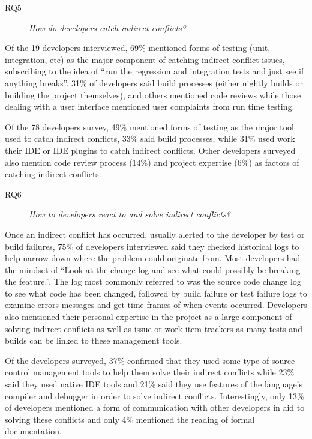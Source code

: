 \documentclass[conference]{IEEEtran}
\begin{document}

\begin{description}
	\item[RQ5] \textit{How do developers catch indirect conflicts?}
\end{description}

Of the 19 developers interviewed, 69\% mentioned forms of testing (unit, integration, etc) as the major component of catching indirect
conflict issues, subscribing to the idea of ``run the regression and integration tests and just see if anything breaks''. 31\% of developers 
said build processes (either nightly builds or building the project themselves), and others mentioned code reviews
while those dealing with a user interface mentioned user complaints from run time testing.

Of the 78 developers survey, 49\% mentioned forms of testing as the major tool used to catch indirect conflicts, 33\% said build processes,
while 31\% used work their IDE or IDE plugins to catch indirect conflicts. Other developers surveyed also mention code review process (14\%)
and project expertise (6\%) as factors of catching indirect conflicts.

\begin{description}
	\item[RQ6] \textit{How to developers react to and solve indirect conflicts?}
\end{description}

Once an indirect conflict has occurred, usually alerted to the developer by test or build failures, 75\% of developers interviewed said
they checked historical logs to help narrow down where the problem could originate from. Most developers had the mindset of
``Look at the change log and see what could possibly be breaking the feature.''. The log most commonly referred to was the source
code change log to see what code has been changed, followed by build failure or test failure logs to examine errors messages and get time 
frames of when events occurred. Developers also mentioned their personal expertise in the project as a large component of solving indirect
conflicts as well as issue or work item trackers as many tests and builds can be linked to these management tools.

Of the developers surveyed, 37\% confirmed that they used some type of source control management tools to help them solve their indirect
conflicts while 23\% said they used native IDE tools and 21\% said they use features of the language's compiler and debugger in order
to solve indirect conflicts. Interestingly, only 13\% of developers mentioned a form of communication with other developers in aid to
solving these conflicts and only 4\% mentioned the reading of formal documentation.
\end{document}
